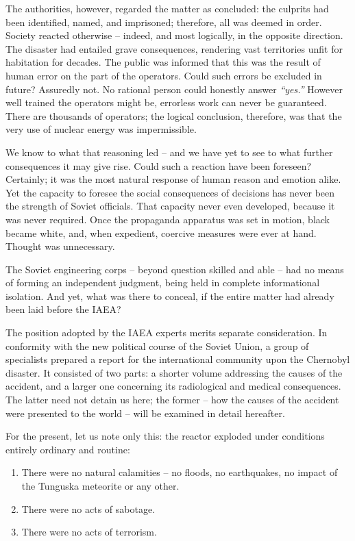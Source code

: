 \documentclass[openright]{bookest}
\begin{document}
The authorities, however, regarded the matter as concluded: the culprits had been identified, named, and imprisoned; therefore, all was deemed in order. Society reacted otherwise -- indeed, and most logically, in the opposite direction. The disaster had entailed grave consequences, rendering vast territories unfit for habitation for decades. The public was informed that this was the result of human error on the part of the operators. Could such errors be excluded in future? Assuredly not. No rational person could honestly answer \textit{``yes.''} However well trained the operators might be, errorless work can never be guaranteed. There are thousands of operators; the logical conclusion, therefore, was that the very use of nuclear energy was impermissible.

We know to what that reasoning led -- and we have yet to see to what further consequences it may give rise. Could such a reaction have been foreseen? Certainly; it was the most natural response of human reason and emotion alike. Yet the capacity to foresee the social consequences of decisions has never been the strength of Soviet officials. That capacity never even developed, because it was never required. Once the propaganda apparatus was set in motion, black became white, and, when expedient, coercive measures were ever at hand. Thought was unnecessary.

The Soviet engineering corps -- beyond question skilled and able -- had no means of forming an independent judgment, being held in complete informational isolation. And yet, what was there to conceal, if the entire matter had already been laid before the IAEA?

The position adopted by the IAEA experts merits separate consideration. In conformity with the new political course of the Soviet Union, a group of specialists prepared a report for the international community upon the Chernobyl disaster. It consisted of two parts: a shorter volume addressing the causes of the accident, and a larger one concerning its radiological and medical consequences. The latter need not detain us here; the former -- how the causes of the accident were presented to the world -- will be examined in detail hereafter.

For the present, let us note only this: the reactor exploded under conditions entirely ordinary and routine:

\begin{enumerate}
  \item There were no natural calamities -- no floods, no earthquakes, no impact of the Tunguska meteorite or any other.
  \item There were no acts of sabotage.
  \item There were no acts of terrorism.
\end{enumerate}
\end{document}
